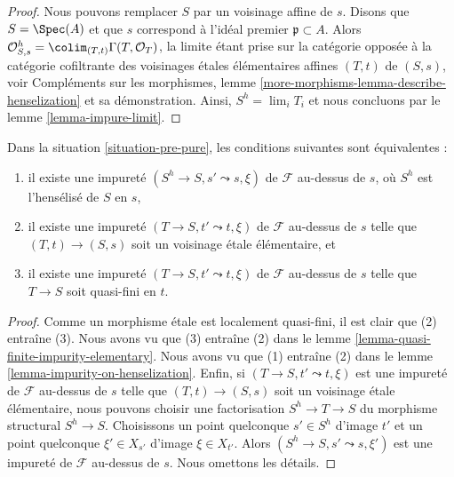 \begin{proof}
Nous pouvons remplacer $S$ par un voisinage affine de $s$.
Disons que $S = \Spec(A)$ et que $s$ correspond à l'idéal premier
$\mathfrak p \subset A$. Alors
$\mathcal{O}_{S, s}^h = \colim_{(T, t)} \Gamma(T, \mathcal{O}_T)$,
la limite étant prise sur la catégorie opposée à la
catégorie cofiltrante des voisinages \'etales élémentaires affines
$(T, t)$ de $(S, s)$, voir
Compléments sur les morphismes,
lemme \ref{more-morphisms-lemma-describe-henselization}
et sa démonstration. Ainsi, $S^h = \lim_i T_i$ et nous concluons par le
lemme \ref{lemma-impure-limit}.
\end{proof}

\begin{lemma}
\label{lemma-pure-along-X-s}
Dans la situation \ref{situation-pre-pure}, les conditions suivantes
sont équivalentes :
\begin{enumerate}
\item il existe une impureté $(S^h \to S, s' \leadsto s, \xi)$
de $\mathcal{F}$ au-dessus de $s$, où $S^h$ est l'hensélisé de $S$ en $s$,
\item il existe une impureté $(T \to S, t' \leadsto t, \xi)$
de $\mathcal{F}$ au-dessus de $s$ telle que $(T, t) \to (S, s)$ soit un
voisinage \'etale élémentaire, et
\item il existe une impureté $(T \to S, t' \leadsto t, \xi)$
de $\mathcal{F}$ au-dessus de $s$ telle que $T \to S$ soit quasi-fini en $t$.
\end{enumerate}
\end{lemma}

\begin{proof}
Comme un morphisme \'etale est localement quasi-fini, il est clair que
(2) entraîne (3). Nous avons vu que (3) entraîne (2) dans le
lemme \ref{lemma-quasi-finite-impurity-elementary}.
Nous avons vu que (1) entraîne (2) dans le
lemme \ref{lemma-impurity-on-henselization}.
Enfin, si $(T \to S, t' \leadsto t, \xi)$ est une impureté
de $\mathcal{F}$ au-dessus de $s$ telle que $(T, t) \to (S, s)$ soit un
voisinage \'etale élémentaire, nous pouvons choisir une factorisation
$S^h \to T \to S$ du morphisme structural $S^h \to S$.
Choisissons un point quelconque $s' \in S^h$ d'image $t'$ et un point quelconque
$\xi' \in X_{s'}$ d'image $\xi \in X_{t'}$. Alors
$(S^h \to S, s' \leadsto s, \xi')$ est une impureté de
$\mathcal{F}$ au-dessus de $s$. Nous omettons les détails.
\end{proof}





